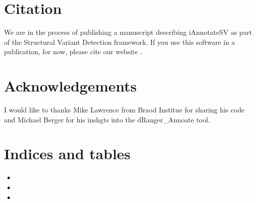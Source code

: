 \documentclass[letterpaper,10pt,english]{sphinxmanual}
\begin{document}
\chapter{Citation}
\label{\detokenize{index:citation}}
We are in the process of publishing a manuscript describing iAnnotateSV as part of the Structural Variant Detection framework.
If you use this software in a publication, for now, please cite our website .


\chapter{Acknowledgements}
\label{\detokenize{index:acknowledgements}}
I would like to thanks Mike Lawrence from Braod Institue for sharing his code and Michael Berger for his inshgts into the dRanger\_Annoate tool.


\chapter{Indices and tables}
\label{\detokenize{index:indices-and-tables}}\begin{itemize}
\item {} 

\item {} 

\item {} 

\end{itemize}



\renewcommand{\indexname}{Index}
\printindex
\end{document}
